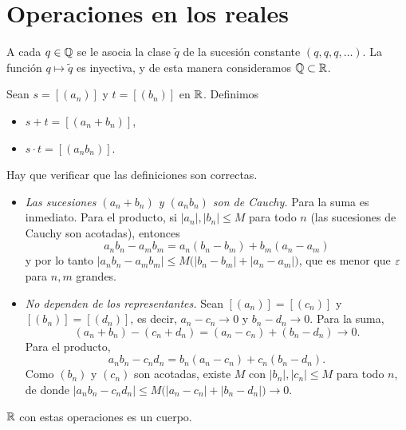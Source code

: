 \section{Operaciones en los reales}

\begin{note}
  A cada \(q \in \mathbb{Q}\) se le asocia la clase \(\tilde{q}\) de la sucesión constante \((q, q, q, \dots)\). La función \(q \mapsto \tilde{q}\) es inyectiva, y de esta manera consideramos \(\mathbb{Q} \subset \mathbb{R}\).
\end{note}

\begin{definition}
  Sean \(s = [(a_n)]\) y \(t = [(b_n)]\) en \(\mathbb{R}\). Definimos
  \begin{itemize}
    \item \(s + t = [(a_n + b_n)]\),
    \item \(s \cdot t = [(a_n b_n)]\).
  \end{itemize}
\end{definition}

Hay que verificar que las definiciones son correctas.

\begin{itemize}
  \item \emph{Las sucesiones \((a_n + b_n)\) y \((a_n b_n)\) son de Cauchy.} Para la suma es inmediato. Para el producto, si \(|a_n|, |b_n| \leq M\) para todo \(n\) (las sucesiones de Cauchy son acotadas), entonces
        \[
          a_n b_n - a_m b_m = a_n (b_n - b_m) + b_m (a_n - a_m)
        \]
        y por lo tanto \(|a_n b_n - a_m b_m| \leq M \bigl( |b_n - b_m| + |a_n - a_m| \bigr)\), que es menor que \(\varepsilon\) para \(n, m\) grandes.
  \item \emph{No dependen de los representantes.} Sean \([(a_n)] = [(c_n)]\) y \([(b_n)] = [(d_n)]\), es decir, \(a_n - c_n \to 0\) y \(b_n - d_n \to 0\). Para la suma,
        \[
          (a_n + b_n) - (c_n + d_n) = (a_n - c_n) + (b_n - d_n) \to 0.
        \]
        Para el producto,
        \[
          a_n b_n - c_n d_n = b_n (a_n - c_n) + c_n (b_n - d_n).
        \]
        Como \((b_n)\) y \((c_n)\) son acotadas, existe \(M\) con \(|b_n|, |c_n| \leq M\) para todo \(n\), de donde \(|a_n b_n - c_n d_n| \leq M \bigl( |a_n - c_n| + |b_n - d_n| \bigr) \to 0\).
\end{itemize}

\begin{prop}
  \(\mathbb{R}\) con estas operaciones es un cuerpo.
\end{prop}

